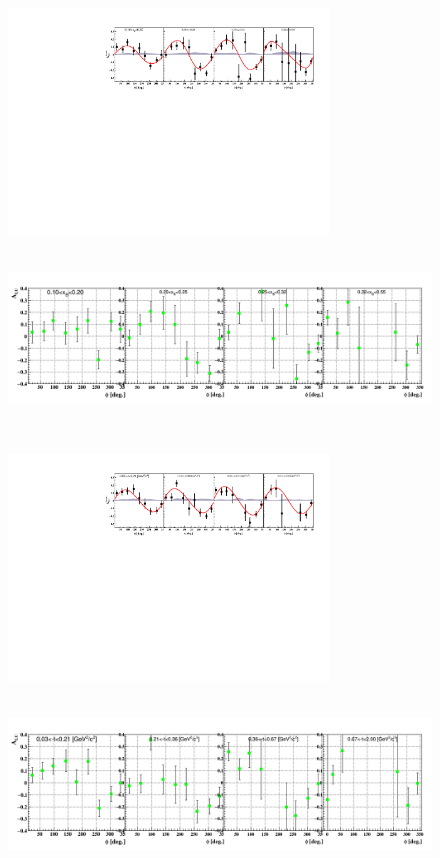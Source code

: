 \begin{figure}[h!]
   \includegraphics[height=6.0cm]{incoh/ALU_phi_p_x.pdf}
   \includegraphics[height=5.2cm]{incoh/BSA_InCoherent_xB.png}
\caption{}
\label{fig:cuts}
\end{figure}


\begin{figure}[h!]
   \includegraphics[height=6.0cm]{incoh/ALU_phi_p_t.pdf}
   \includegraphics[height=5.2cm]{incoh/BSA_InCoherent_t.png}
\caption{}
\label{fig:cuts}
\end{figure}








